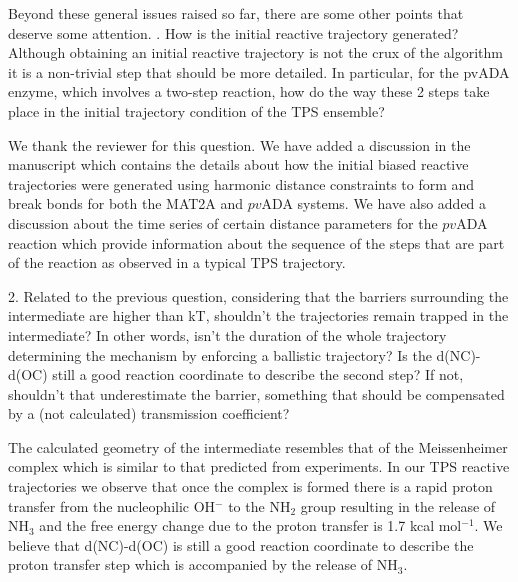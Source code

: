 \documentclass[journal=jpcbfk,manuscript=article,layout=traditional]{achemso}
\begin{document}
{\begin{response}{Beyond these general issues raised so far, there are some other points 
that deserve some attention.
. How is the initial reactive trajectory generated? Although obtaining an initial reactive 
trajectory is not the crux of the algorithm it is a non-trivial step that should be more 
detailed. In particular, for the pvADA enzyme, which involves a two-step reaction, how 
do the way these 2 steps take place in the initial trajectory condition of the TPS ensemble?}

We thank the reviewer for this question. We have added a discussion in the manuscript
which contains the details about how the initial biased reactive trajectories were
generated using harmonic distance constraints to form and break bonds for both the 
MAT2A and $pv$ADA systems. We have also added a discussion about the 
time series of certain distance parameters for the $pv$ADA reaction which provide 
information about the sequence of the steps that are part of the reaction as observed 
in a typical TPS trajectory.    

\end{response}

\begin{response}{2. Related to the previous question, considering that the barriers 
surrounding the intermediate are higher than kT, shouldn't the trajectories remain 
trapped in the intermediate? In other words, isn't the duration of the whole trajectory 
determining the mechanism by enforcing a ballistic trajectory? Is the d(NC)-d(OC) still 
a good reaction coordinate to describe the second step? If not, shouldn't that underestimate 
the barrier, something that should be compensated by a (not calculated) transmission coefficient?}

The calculated geometry of the intermediate resembles that of the Meissenheimer complex 
which is similar to that predicted from experiments. In our TPS reactive trajectories we 
observe that once the complex is formed there is a rapid proton transfer from the 
nucleophilic OH$^{-}$ to the NH$_2$ group resulting in the release of NH$_3$ and the free 
energy change due to the proton transfer is 1.7 kcal mol$^{-1}$. We believe that d(NC)-d(OC) 
is still a good reaction coordinate to describe the proton transfer step which is accompanied by 
the release of NH$_3$. 
   

\end{response}}
\end{document}
